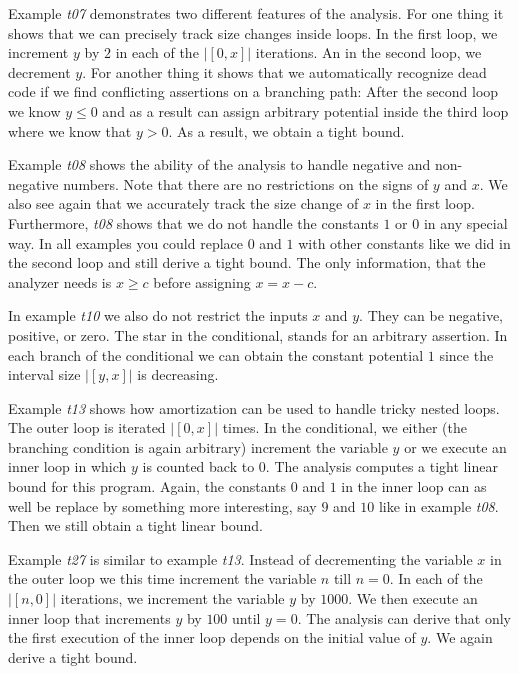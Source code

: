 \documentclass[nocopyrightspace,preprint,pldi]{sigplanconf-pldi15}
\begin{document}
{Example \emph{t07} demonstrates two different features of the
analysis.  For one thing it shows that we can precisely track size
changes inside loops.  In the first loop, we increment $y$ by $2$ in
each of the $|[0,x]|$ iterations.  An in the second loop, we decrement
$y$.  For another thing it shows that we automatically recognize dead
code if we find conflicting assertions on a branching path: After the
second loop we know $y \leq 0$ and as a result can assign arbitrary
potential inside the third loop where we know that $y>0$.  As a
result, we obtain a tight bound.

Example \emph{t08} shows the ability of the analysis to handle
negative and non-negative numbers.  Note that there are no
restrictions on the signs of $y$ and $x$.  We also see again that we
accurately track the size change of $x$ in the first loop.
Furthermore, \emph{t08} shows that we do not handle the constants $1$
or $0$ in any special way.  In all examples you could replace $0$ and
$1$ with other constants like we did in the second loop and still
derive a tight bound.  The only information, that the analyzer needs
is $x \geq c$ before assigning $x = x - c$.

In example \emph{t10} we also do not restrict the inputs $x$ and $y$.
They can be negative, positive, or zero.  The star {\tt *} in the
conditional, stands for an arbitrary assertion.  In each branch of the
conditional we can obtain the constant potential $1$ since the interval
size $|[y,x]|$ is decreasing.

Example \emph{t13} shows how amortization can be used to handle tricky
nested loops.  The outer loop is iterated $|[0,x]|$ times.  In the
conditional, we either (the branching condition is again arbitrary)
increment the variable $y$ or we execute an inner loop in which $y$ is
counted back to $0$.  The analysis computes a tight linear bound for
this program.  Again, the constants $0$ and $1$ in the inner loop can
as well be replace by something more interesting, say $9$ and $10$
like in example \emph{t08}.  Then we still obtain a tight linear
bound.

Example \emph{t27} is similar to example \emph{t13}.  Instead of
decrementing the variable $x$ in the outer loop we this time increment
the variable $n$ till $n = 0$.  In each of the $|[n,0]|$ iterations,
we increment the variable $y$ by $1000$.  We then execute an inner
loop that increments $y$ by $100$ until $y=0$.  The analysis can
derive that only the first execution of the inner loop depends on the
initial value of $y$.  We again derive a tight bound.

}
\end{document}

